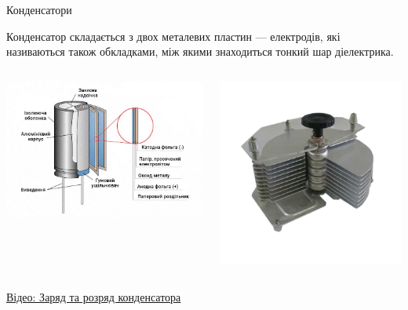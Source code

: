 \documentclass[onlytextwidth]{beamer}
\begin{document}
\begin{frame}{Конденсатори}{}\justifying
	\begin{block}{}
		Конденсатор складається з двох металевих пластин --- електродів, які називаються також
		\alert{обкладками}, між якими знаходиться тонкий шар діелектрика.
		\begin{columns}
			\begin{column}{0.6\linewidth}
				\includegraphics[width=\linewidth]{condensator}
			\end{column}
			\begin{column}{0.4\linewidth}
				\includegraphics[width=\linewidth]{varcap}
			\end{column}
		\end{columns}
	\end{block}
	\begin{block}{}
		\href{https://www.youtube.com/watch?v=HmbwM8cM1FU&ab_channel=UW-MadisonPhysicsLectureDemonstrations}{\color{blue}Відео:
			Заряд та розряд конденсатора}
	\end{block}
\end{frame}
\end{document}
